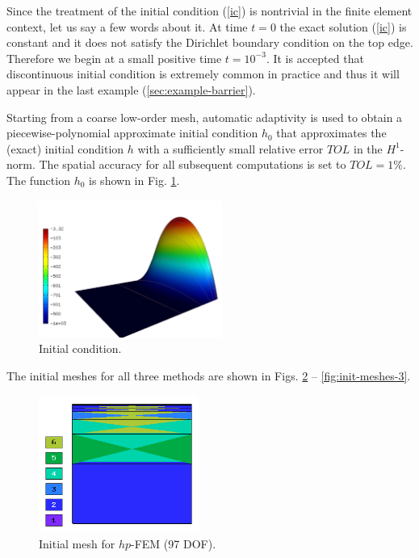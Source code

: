 \documentclass[final,3p,times,twocolumn]{elsarticle}
\begin{document}
Since the treatment of the initial condition (\ref{ic}) is nontrivial
in the finite element context, let us say a few words about it. 
At time $t = 0$ the exact solution (\ref{ic}) is constant and it 
does not satisfy the Dirichlet boundary condition on the top edge. 
Therefore we begin at a small positive time $t = 10^{-3}$.
It is accepted that discontinuous initial condition is extremely common
in practice and thus it will appear in the last example (\ref{sec:example-barrier}).

Starting from a coarse low-order mesh, automatic adaptivity is used
to obtain a piecewise-polynomial approximate initial condition 
$h_0$ that approximates the (exact) initial condition $h$ with 
a sufficiently small relative error $TOL$ in the $H^1$-norm. The 
spatial accuracy for all subsequent computations is set to $TOL = 1\%$.
The function $h_0$ is shown in Fig. \ref{fig:init-cond}.

\begin{figure}[!ht]
\begin{center}
\includegraphics[height=4.5cm]{init-tracy.png}
\end{center}
\vspace{-6mm}
\caption{Initial condition.}
\label{fig:init-cond}
\end{figure}
\vspace{4mm}
\noindent
The initial meshes for all three methods are shown in 
Figs. \ref{fig:init-meshes-1} -- \ref{fig:init-meshes-3}.

\begin{figure}[!ht]
\begin{center}
\includegraphics[height=4.5cm]{mesh_init_hp.png}
\end{center}
\vspace{-6mm}
\caption{Initial mesh for $hp$-FEM (97 DOF).}
\label{fig:init-meshes-1}
\end{figure}
\end{document}
